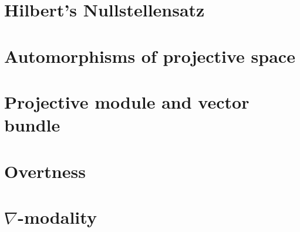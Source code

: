 \documentclass{../util/zariski}
\begin{document}
\section{Hilbert's Nullstellensatz}


\section{Automorphisms of projective space}


\section{Projective module and vector bundle}


\section{Overtness}


\section{$\nabla$-modality}


\printindex

\printbibliography
\end{document}
